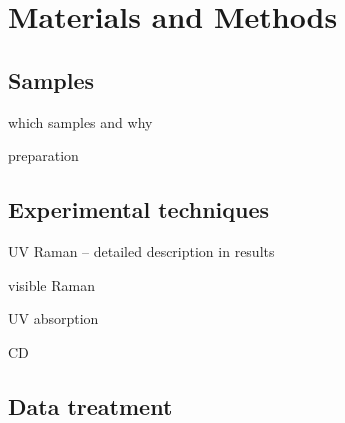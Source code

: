 \chapter{Materials and Methods}

\section{Samples}

\begin{docitemize}
	\item which samples and why
	\item preparation
\end{docitemize}

\section{Experimental techniques}

\begin{docitemize}
	\item UV Raman -- detailed description in results
	\item visible Raman
	\item UV absorption
	\item CD
\end{docitemize}

\section{Data treatment}
\label{data_treatment}
